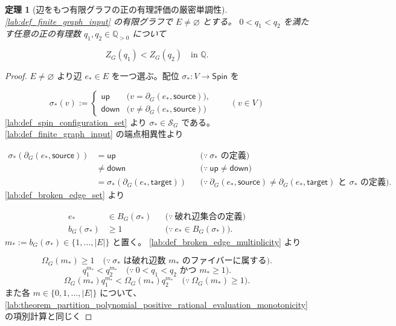 \documentclass[11pt,a4paper]{article}
\newtheorem{theorem}[definition]{定理}
\theoremstyle{remark}
\begin{document}
\begin{theorem}[辺をもつ有限グラフの正の有理評価の厳密単調性]\label{lab:theorem_partition_polynomial_positive_rational_evaluation_strict_monotonicity}
\cref{lab:def_finite_graph_input}
 の有限グラフで 
$E\ne\varnothing$
 とする。
$0<q_1<q_2$
 を満たす任意の正の有理数 
$q_1,q_2\in\mathbb Q_{>0}$
 について

\[Z_G(q_1)<Z_G(q_2)\quad\text{in }\mathbb Q.\]
\end{theorem}
\begin{proof}
$E\ne\varnothing$
 より辺 
$e_*\in E$
 を一つ選ぶ。配位 
$\sigma_*:V\to\mathsf{Spin}$
 を

\[\sigma_*(v):=
\begin{cases}
\mathsf{up} & \bigl(v=\partial_G(e_*,\mathsf{source})\bigr),\\
\mathsf{down} & \bigl(v\ne\partial_G(e_*,\mathsf{source})\bigr)
\end{cases}
\qquad(v\in V)\]
\cref{lab:def_spin_configuration_set}
 より 
$\sigma_*\in\mathcal S_G$
 である。
\cref{lab:def_finite_graph_input}
 の端点相異性より

\[\begin{aligned}
\sigma_*\!\left(\partial_G(e_*,\mathsf{source})\right)
&=\mathsf{up}
&&\bigl(\because\ \sigma_*\text{ の定義}\bigr)\\
&\ne\mathsf{down}
&&\bigl(\because\ \mathsf{up}\ne\mathsf{down}\bigr)\\
&=\sigma_*\!\left(\partial_G(e_*,\mathsf{target})\right)
&&\bigl(\because\ \partial_G(e_*,\mathsf{source})\ne\partial_G(e_*,\mathsf{target})\text{ と }\sigma_*\text{ の定義}\bigr).
\end{aligned}\]
\cref{lab:def_broken_edge_set}
 より

\[\begin{aligned}
e_*
&\in B_G(\sigma_*)
&&\bigl(\because\ \text{破れ辺集合の定義}\bigr)\\
b_G(\sigma_*)
&\ge1
&&\bigl(\because\ e_*\in B_G(\sigma_*)\bigr).
\end{aligned}\]
$m_*:=b_G(\sigma_*)\in\{1,\ldots,|E|\}$
 と置く。
\cref{lab:def_broken_edge_multiplicity}
 より

\[\Omega_G(m_*)\ge1
\quad\bigl(\because\ \sigma_*\text{ は破れ辺数 }m_*\text{ のファイバーに属する}\bigr).\]
\[q_1^{m_*}<q_2^{m_*}
\quad\bigl(\because\ 0<q_1<q_2\text{ かつ }m_*\ge1\bigr).\]
\[\Omega_G(m_*)q_1^{m_*}<\Omega_G(m_*)q_2^{m_*}
\quad\bigl(\because\ \Omega_G(m_*)\ge1\bigr).\]
また各 
$m\in\{0,1,\ldots,|E|\}$
 について、
\cref{lab:theorem_partition_polynomial_positive_rational_evaluation_monotonicity}
 の項別計算と同じく


\end{proof}
\end{document}
